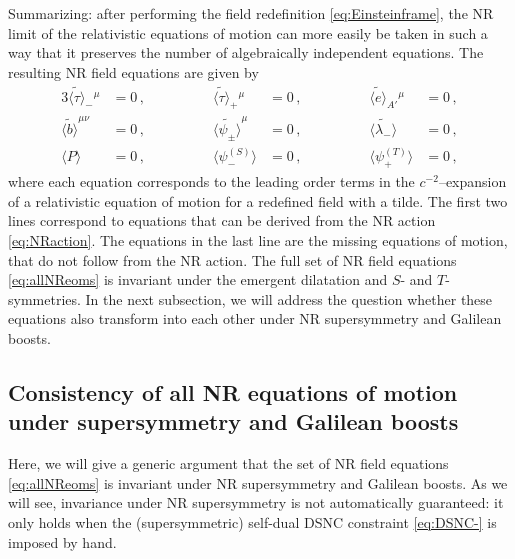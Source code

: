 \documentclass[a4paper,10pt,openany]{article}
\begin{document}
	Summarizing: after performing the field redefinition \eqref{eq:Einsteinframe}, the NR limit of the relativistic equations of motion can more easily be taken in such a way that it preserves the number of algebraically independent equations. The resulting NR field equations are given by
	\begin{alignat}{3} \label{eq:allNReoms}
		\widetilde{\langle \tau \rangle}_-{}^\mu &= 0 \,, \qquad \qquad & \widetilde{\langle \tau \rangle}_+{}^\mu &= 0 \,, \qquad \qquad & \widetilde{\langle e \rangle}_{A'}{}^\mu &= 0 \,, \nonumber \\
		\widetilde{\langle b \rangle}^{\mu\nu} &= 0 \,, \qquad \qquad & \widetilde{\langle \psi_\pm \rangle}^\mu &= 0 \,, \qquad \qquad & \widetilde{\langle \lambda_- \rangle} &= 0 \,, \nonumber \\
		\langle P \rangle &= 0 \,, \qquad \qquad & \langle\psi_-^{(S)}\rangle &= 0 \,, \qquad \qquad & \langle \psi_+^{(T)}\rangle &= 0 \,,
	\end{alignat}
	where each equation corresponds to the leading order terms in the $c^{-2}$--expansion of a relativistic equation of motion for a redefined field with a tilde. The first two lines correspond to equations that can be derived from the NR action \eqref{eq:NRaction}. The equations in the last line are the missing equations of motion, that do not follow from the NR action. The full set of NR field equations \eqref{eq:allNReoms} is invariant under the emergent dilatation and $S$- and $T$-symmetries. In the next subsection, we will address the question whether these equations also transform into each other under NR supersymmetry and Galilean boosts.
	
	\subsection{Consistency of all NR equations of motion under supersymmetry and Galilean boosts}
	
	Here, we will give a generic argument that the set of NR field equations \eqref{eq:allNReoms} is invariant under NR supersymmetry and Galilean boosts. As we will see, invariance under NR supersymmetry is not automatically guaranteed: it only holds when the (supersymmetric) self-dual DSNC constraint \eqref{eq:DSNC-} is imposed by hand.
	
\end{document}
